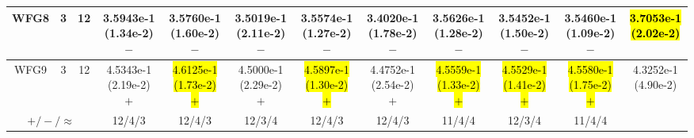 \documentclass[journal]{IEEEtran}
\begin{document}
\begin{table*}[htbp]
\begin{tabular}{cccccccccccc}
\hline
\multirow{1}{*}{WFG8}&3&12&3.5943e-1 (1.34e-2) $-$&3.5760e-1 (1.60e-2) $-$&3.5019e-1 (2.11e-2) $-$&3.5574e-1 (1.27e-2) $-$&3.4020e-1 (1.78e-2) $-$&3.5626e-1 (1.28e-2) $-$&3.5452e-1 (1.50e-2) $-$&3.5460e-1 (1.09e-2) $-$&\hl{3.7053e-1 (2.02e-2)}\\
\hline
\multirow{1}{*}{WFG9}&3&12&4.5343e-1 (2.19e-2) $+$&\hl{4.6125e-1 (1.73e-2) $+$}&4.5000e-1 (2.29e-2) $+$&\hl{4.5897e-1 (1.30e-2) $+$}&4.4752e-1 (2.54e-2) $+$&\hl{4.5559e-1 (1.33e-2) $+$}&\hl{4.5529e-1 (1.41e-2) $+$}&\hl{4.5580e-1 (1.75e-2) $+$}&4.3252e-1 (4.90e-2)\\
\hline
\multicolumn{3}{c}{$+/-/\approx$}&12/4/3&12/4/3&12/3/4&12/4/3&12/4/3&11/4/4&12/3/4&11/4/4&\\
\bottomrule
\end{tabular}
\label{No Label}
\end{table*}
\end{document}
